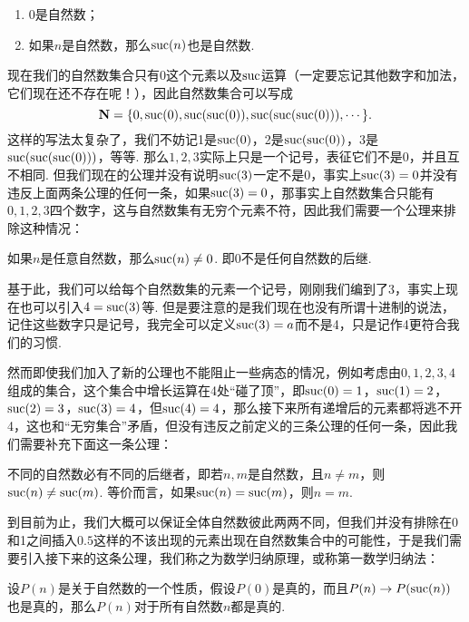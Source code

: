 \begin{axiom}
    \begin{enumerate}
        \item 0是自然数；

        \item 如果$n$是自然数，那么$\operatorname{suc}(n)$也是自然数.
    \end{enumerate}
\end{axiom}

现在我们的自然数集合只有0这个元素以及$\operatorname{suc}$运算（一定要忘记其他数字和加法，它们现在还不存在呢！），因此自然数集合可以写成
\[\mathbf{N}=\{0,\operatorname{suc}(0),\operatorname{suc}(\operatorname{suc}(0)),\operatorname{suc}(\operatorname{suc}(\operatorname{suc}(0))),\cdots\}.\]
这样的写法太复杂了，我们不妨记1是$\operatorname{suc}(0)$，2是$\operatorname{suc}(\operatorname{suc}(0))$，3是$\operatorname{suc}(\operatorname{suc}(\operatorname{suc}(0)))$，等等. 那么$1,2,3$实际上只是一个记号，表征它们不是0，并且互不相同. 但我们现在的公理并没有说明$\operatorname{suc}(3)$一定不是0，事实上$\operatorname{suc}(3)=0$并没有违反上面两条公理的任何一条，如果$\operatorname{suc}(3)=0$，那事实上自然数集合只能有$0,1,2,3$四个数字，这与自然数集有无穷个元素不符，因此我们需要一个公理来排除这种情况：

\begin{axiom}%
    如果$n$是任意自然数，那么$\operatorname{suc}(n)\neq 0$. 即0不是任何自然数的后继.
\end{axiom}

基于此，我们可以给每个自然数集的元素一个记号，刚刚我们编到了3，事实上现在也可以引入$4=\operatorname{suc}(3)$等. 但是要注意的是我们现在也没有所谓十进制的说法，记住这些数字只是记号，我完全可以定义$\operatorname{suc}(3)=a$而不是4，只是记作4更符合我们的习惯.

然而即使我们加入了新的公理也不能阻止一些病态的情况，例如考虑由$0,1,2,3,4$组成的集合，这个集合中增长运算在4处``碰了顶''，即$\operatorname{suc}(0)=1$，$\operatorname{suc}(1)=2$，$\operatorname{suc}(2)=3$，$\operatorname{suc}(3)=4$，但$\operatorname{suc}(4)=4$，那么接下来所有递增后的元素都将逃不开4，这也和``无穷集合''矛盾，但没有违反之前定义的三条公理的任何一条，因此我们需要补充下面这一条公理：

\begin{axiom}
    不同的自然数必有不同的后继者，即若$n,m$是自然数，且$n\neq m$，则$\operatorname{suc}(n)\neq \operatorname{suc}(m)$. 等价而言，如果$\operatorname{suc}(n)=\operatorname{suc}(m)$，则$n=m$.
\end{axiom}

到目前为止，我们大概可以保证全体自然数彼此两两不同，但我们并没有排除在0和1之间插入$0.5$这样的不该出现的元素出现在自然数集合中的可能性，于是我们需要引入接下来的这条公理，我们称之为数学归纳原理，或称第一数学归纳法：

\begin{axiom}%
    \label{thm:1e:数学归纳原理} 
    设$P(n)$是关于自然数的一个性质，假设$P(0)$是真的，而且$P(n) \rightarrow P(\operatorname{suc}(n))$也是真的，那么$P(n)$对于所有自然数$n$都是真的.
\end{axiom}

